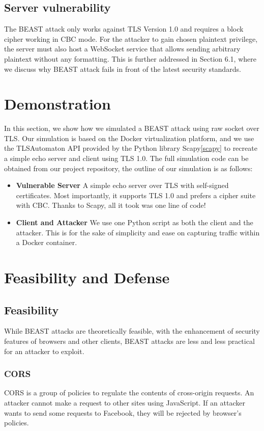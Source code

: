 \documentclass{acm_proc_article-sp}
\begin{document}
\subsection{Server vulnerability}
The BEAST attack only works against TLS Version 1.0 and requires a block cipher working in CBC
mode. For the attacker to gain chosen plaintext privilege, the server must also host a WebSocket
service that allows sending arbitrary plaintext without any formatting. This is further addressed in
Section 6.1, where we discuss why BEAST attack fails in front of the latest security standards.

\section{Demonstration}
In this section, we show how we simulated a BEAST attack using raw socket over TLS.
Our simulation is based on the Docker virtualization platform, and we use the TLSAutomaton API
provided by the Python library Scapy\ref{scapy} to recreate a simple echo server and client using
TLS 1.0. The full simulation code can be obtained from our project repository, the outline of our
simulation is as follows:
\begin{itemize}
    \item \textbf{Vulnerable Server} A simple echo server over TLS with self-signed certificates. Most
    importantly, it supports TLS 1.0 and prefers a cipher suite with CBC. Thanks to Scapy, all it took
    was one line of code!
    \item \textbf{Client and Attacker} We use one Python script as both the client and the attacker. This
    is for the sake of simplicity and ease on capturing traffic within a Docker container.
\end{itemize}

\section{Feasibility and Defense}
\subsection{Feasibility}
While BEAST attacks are theoretically feasible, with the enhancement of security
features of browsers and other clients, BEAST attacks are less and less practical
for an attacker to exploit.

\subsubsection{CORS}
CORS is a group of policies to regulate the contents of cross-origin requests.
An attacker cannot make a request to other sites using JavaScript. If an attacker
wants to send some requests to Facebook, they will be rejected by browser's policies.
\end{document}
